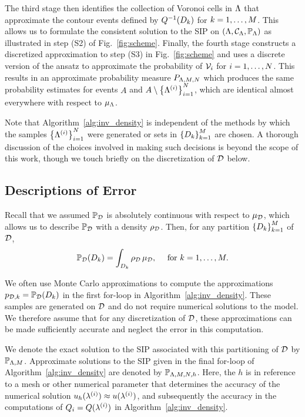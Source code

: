 The third stage then identifies the collection of Voronoi cells in ${\Lambda}$ that approximate the contour events defined by $Q^{-1}(D_k)$ for $k=1,\hdots,M$. This allows us to formulate the consistent solution to the SIP on $({\Lambda}, \mathcal{C}_{{\Lambda}}, \operatorname*{\mathbb{P}_{{\Lambda}}})$ as illustrated in step (S2) of Fig.~\ref{fig:scheme}. 
Finally, the fourth stage constructs a discretized approximation to step (S3) in Fig.~\ref{fig:scheme} and uses a discrete version of the ansatz to approximate the probability of $\mathcal{V}_i$ for $i=1,\dots,N$. 
This results in an approximate probability measure $P_{{\Lambda}, M, N}$ which produces the same probability estimates for events $A$ and $A\setminus \left\{ {\Lambda}^{(i)} \right\}_{i=1}^N$, which are identical almost everywhere with respect to $\mu_{{\Lambda}}$. 

Note that Algorithm~\ref{alg:inv_density} is independent of the methods by which the samples $\left\{ {\Lambda}^{(i)} \right\}_{i=1}^{N}$ were generated or sets in $\left\{D_k\right\}_{k=1}^{M}$ are chosen.  
A thorough discussion of the choices involved in making such decisions is beyond the scope of this work, though we touch briefly on the discretization of $\mathcal{D}$ below. 



\subsection{Descriptions of Error}\label{sec:set-error}
Recall that we assumed $\operatorname*{\mathbb{P}_{\mathcal{D}}}$ is absolutely continuous with respect to $\mu_{\mathcal{D}}$, which allows us to describe $\operatorname*{\mathbb{P}_{\mathcal{D}}}$ with a density $\rho_{\mathcal{D}}$. Then, for any partition $\left\{D_k\right\}_{k=1}^{M}$ of $\mathcal{D}$, 
\[
\operatorname*{\mathbb{P}_{\mathcal{D}}} (D_k) = \int_{D_k} \rho_{\mathcal{D}} \, \mu_{\mathcal{D}}, \quad \text{ for } k = 1, \hdots, M.
\]

We often use Monte Carlo approximations to compute the approximations $p_{\mathcal{D}, k}=\operatorname*{\mathbb{P}_{\mathcal{D}}}(D_k)$ in the first for-loop in Algorithm~\ref{alg:inv_density}. 
These samples are generated on $\mathcal{D}$ and do not require numerical solutions to the model. 
We therefore assume that for any discretization of $\mathcal{D}$, these approximations can be made sufficiently accurate and neglect the error in this computation. 

We denote the exact solution to the SIP associated with this partitioning of $\mathcal{D}$ by $\mathbb{P}_{{\Lambda}, M}$. 
Approximate solutions to the SIP given in the final for-loop of Algorithm~\ref{alg:inv_density} are denoted by $\mathbb{P}_{{\Lambda}, M, N, h}$.
Here, the $h$ is in reference to a mesh or other numerical parameter that determines the accuracy of the numerical solution $u_h(\lambda^{(i)})\approx u(\lambda^{(i)})$, and subsequently the accuracy in the computations of $Q_i = Q(\lambda^{(i)})$ in Algorithm~\ref{alg:inv_density}.
 
